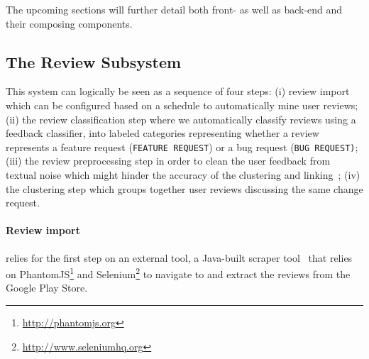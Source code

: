 
The upcoming sections will further detail both front- as well as back-end and their composing components.

%
%
\subsection{The Review Subsystem}


This system can logically be seen as a sequence of four steps: (i) review import which can be configured based on a schedule to automatically mine user reviews; (ii) the review classification step where we automatically classify reviews using a feedback classifier, into labeled categories representing whether a review represents a feature request (\texttt{FEATURE REQUEST}) or a bug request (\texttt{BUG REQUEST)}; (iii) the review preprocessing step in order to clean the user feedback from textual noise which might hinder the accuracy of the clustering and linking~\cite{Palomba2017}; (iv) the clustering step which groups together user reviews discussing the same change request.

\paragraph{Review import} 
\tool{} relies for the first step on an external tool, a Java-built scraper tool~\cite{Grano:2017} that relies on PhantomJS\footnote{\url{http://phantomjs.org}} and Selenium\footnote{\url{http://www.seleniumhq.org}} to navigate to and extract the reviews from the Google Play Store.

